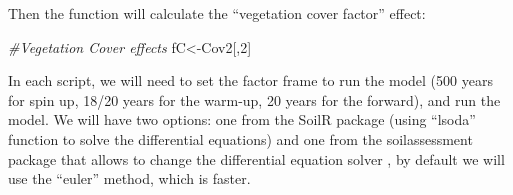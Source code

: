 \documentclass[
  10pt,
  b5paper,
]{book}
\newenvironment{Shaded}{\begin{snugshade}}{\end{snugshade}}
\newcommand{\CommentTok}[1]{\textcolor[rgb]{0.56,0.35,0.01}{\textit{#1}}}
\newcommand{\DataTypeTok}[1]{\textcolor[rgb]{0.13,0.29,0.53}{#1}}
\newcommand{\DecValTok}[1]{\textcolor[rgb]{0.00,0.00,0.81}{#1}}
\newcommand{\KeywordTok}[1]{\textcolor[rgb]{0.13,0.29,0.53}{\textbf{#1}}}
\newcommand{\NormalTok}[1]{#1}
\newcommand{\OperatorTok}[1]{\textcolor[rgb]{0.81,0.36,0.00}{\textbf{#1}}}
\newcommand{\StringTok}[1]{\textcolor[rgb]{0.31,0.60,0.02}{#1}}
\begin{document}
\begin{Shaded}
\end{Shaded}

Then the function will calculate the ``vegetation cover factor'' effect:

\begin{Shaded}
\begin{Highlighting}[]
\CommentTok{#Vegetation Cover effects }
\NormalTok{fC<-Cov2[,}\DecValTok{2}\NormalTok{]}
\end{Highlighting}
\end{Shaded}

In each script, we will need to set the factor frame to run the model (500 years for spin up, 18/20 years for the warm-up, 20 years for the forward), and run the model. We will have two options: one from the SoilR package (using ``lsoda'' function to solve the differential equations) and one from the soilassessment package that allows to change the differential equation solver , by default we will use the ``euler'' method, which is faster.
\end{document}
